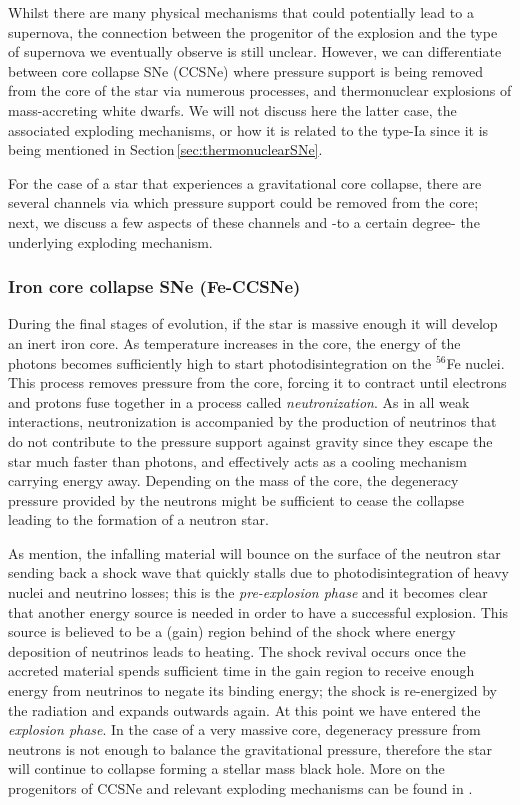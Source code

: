 \documentclass[../../main/thesis_msc.tex]{subfiles}
\begin{document}
				Whilst there are many physical mechanisms that could potentially lead to a supernova, the connection between the progenitor of the explosion and the type of supernova we eventually observe is still unclear. However, we can differentiate between core collapse SNe (CCSNe) where pressure support is being removed from the core of the star via numerous processes, and thermonuclear explosions of mass-accreting white dwarfs. We will not discuss here the latter case, the associated exploding mechanisms, or how it is related to the type-Ia since it is being mentioned in Section\,\ref{sec:thermonuclearSNe}.
				
				For the case of a star that experiences a gravitational core collapse, there are several channels via which pressure support could be removed from the core; next, we discuss a few aspects of these channels and -to a certain degree- the underlying exploding mechanism.
				
				\subsubsection{Iron core collapse SNe (Fe-CCSNe)}
					
					During the final stages of evolution, if the star is massive enough it will develop an inert iron core. As temperature increases in the core, the energy of the photons becomes sufficiently high to start photodisintegration on the $^{56}$Fe nuclei. This process removes pressure from the core, forcing it to contract until electrons and protons fuse together in a process called \emph{neutronization}. As in all weak interactions, neutronization is accompanied by the production of neutrinos that do not contribute to the pressure support against gravity since they escape the star much faster than photons, and effectively acts as a cooling mechanism carrying energy away. Depending on the mass of the core, the degeneracy pressure provided by the neutrons might be sufficient to cease the collapse leading to the formation of a neutron star. 
					
					As \cite{Muller2016} mention, the infalling material will bounce on the surface of the neutron star sending back a shock wave that quickly stalls due to photodisintegration of heavy nuclei and neutrino losses; this is the \emph{pre-explosion phase} and it becomes clear that another energy source is needed in order to have a successful explosion. This source is believed to be a (gain) region behind of the shock where energy deposition of neutrinos leads to heating. The shock revival occurs once the accreted material spends sufficient time in the gain region to receive enough energy from neutrinos to negate its binding energy; the shock is re-energized by the radiation and expands outwards again. At this point we have entered the \emph{explosion phase}. In the case of a very massive core, degeneracy pressure from neutrons is not enough to balance the gravitational pressure, therefore the star will continue to collapse forming a stellar mass black hole. More on the progenitors of CCSNe and relevant exploding mechanisms can be found in \cite{Smartt2009, Couch2017}.
\end{document}
